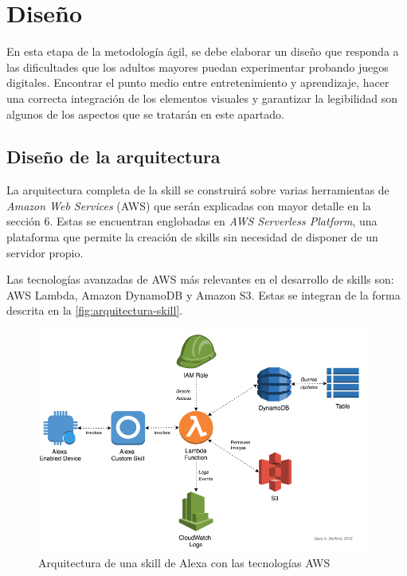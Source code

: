 \section{Diseño}

En esta etapa de la metodología ágil, se debe elaborar un diseño que responda a las dificultades que los adultos mayores puedan experimentar probando juegos digitales. Encontrar el punto medio entre entretenimiento y aprendizaje, hacer una correcta integración de los elementos visuales y garantizar la legibilidad son algunos de los aspectos que se tratarán en este apartado.

\subsection{Diseño de la arquitectura}

La arquitectura completa de la skill se construirá sobre varias herramientas de \textit{Amazon Web Services} (AWS) que serán explicadas con mayor detalle en la sección 6. Estas se encuentran englobadas en \textit{AWS Serverless Platform}, una plataforma que permite la creación de skills sin necesidad de disponer de un servidor propio. 

Las tecnologías avanzadas de AWS más relevantes en el desarrollo de skills son: AWS Lambda, Amazon DynamoDB y Amazon S3. Estas se integran de la forma descrita en la \autoref{fig:arquitectura-skill}.

\begin{figure}[H]
	\centering
	\includegraphics[width=0.98\textwidth]{imgs/arquitectura-skill.png}
	\caption{Arquitectura de una skill de Alexa con las tecnologías AWS \parencite{arquitecturaSkill}}
	\label{fig:arquitectura-skill}
\end{figure}

